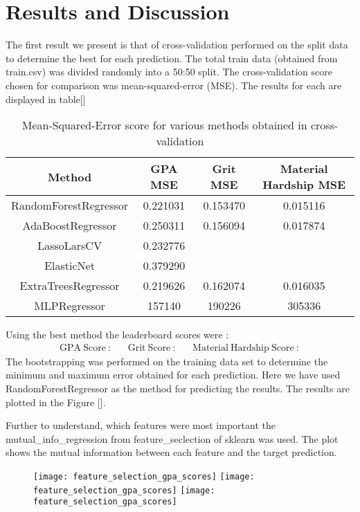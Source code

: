 \section{Results and Discussion}
The first result we present is that of cross-validation performed on the split data to determine the best for each prediction. The total train data (obtained from {\ttfamily train.csv}) was divided randomly into a 50:50 split. The cross-validation score chosen for comparison was mean-squared-error (MSE). The results for each are displayed in table[]

\begin{table}[H]
\centering
	\begin{tabular}{|c|c|c|c|}
	\hline
	Method & GPA MSE & Grit MSE & Material Hardship MSE\\
	\hline
	RandomForestRegressor	&	0.221031	&	0.153470	&	0.015116	\\
	AdaBoostRegressor		&	0.250311	&	0.156094	&	0.017874	\\
	LassoLarsCV				&	0.232776	&		&		\\
	ElasticNet				&	0.379290	&		&		\\
	ExtraTreesRegressor		&	0.219626	&	0.162074	&	0.016035	\\
	MLPRegressor			&	157140	&	190226	&	305336	\\
	\hline
	\end{tabular}
	\caption{Mean-Squared-Error score for various methods obtained in cross-validation}
\end{table}
Using the best method the leaderboard scores were :
\begin{align*}
\mathrm{GPA \ Score \ :}  && \mathrm{Grit \ Score \ :}  && \mathrm{Material \ Hardship \ Score \ :}
\end{align*}
The bootstrapping was performed on the training data set to determine the minimum and maximum error obtained for each prediction. Here we have used RandomForestRegressor as the method for predicting the results. The results are plotted in the Figure [].

Further to understand, which features were most important the {\ttfamily mutual\_info\_regression} from {\ttfamily feature\_seclection} of sklearn was used. The plot shows the mutual information between each feature and the target prediction.
\begin{figure}[H]
\centering
\texttt{[image: feature\_selection\_gpa\_scores]}
\texttt{[image: feature\_selection\_gpa\_scores]}
\texttt{[image: feature\_selection\_gpa\_scores]}
\end{figure}

